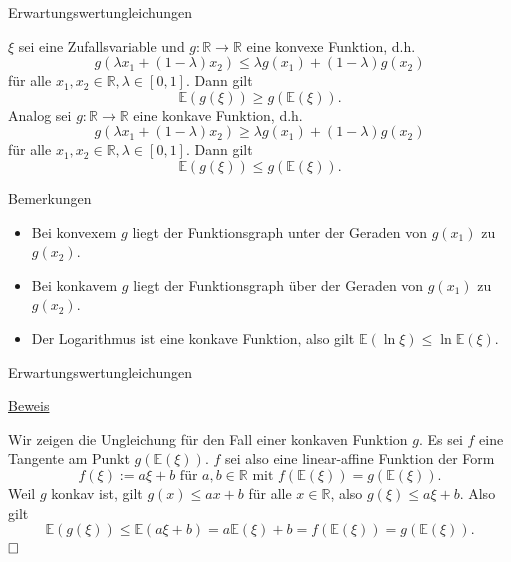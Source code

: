 \documentclass[
  8pt,
  ignorenonframetext,
]{beamer}
\providecommand{\tightlist}{%
  \setlength{\itemsep}{0pt}\setlength{\parskip}{0pt}}
\begin{document}
\begin{frame}{Erwartungswertungleichungen}
\protect\hypertarget{erwartungswertungleichungen-3}{}
\footnotesize
{}
\begin{theorem}
\justifying
\normalfont
$\xi$ sei eine Zufallsvariable und $g : \mathbb{R} \to \mathbb{R}$ eine konvexe Funktion, d.h.
\begin{equation}
g(\lambda x_1 + (1-\lambda)x_2) \le \lambda g(x_1) + (1-\lambda)g(x_2)
\end{equation}
für alle $x_1,x_2 \in \mathbb{R}, \lambda \in [0,1]$. Dann gilt
\begin{equation}
\mathbb{E}(g(\xi)) \ge g(\mathbb{E}(\xi)).
\end{equation}
Analog sei $g : \mathbb{R} \to \mathbb{R}$ eine konkave Funktion, d.h.
\begin{equation}
g(\lambda x_1 + (1-\lambda)x_2) \ge \lambda g(x_1) + (1-\lambda)g(x_2)
\end{equation}
für alle $x_1,x_2 \in \mathbb{R}, \lambda \in [0,1]$. Dann gilt
\begin{equation}
\mathbb{E}(g(\xi)) \le g(\mathbb{E}(\xi)).
\end{equation}
\end{theorem}

Bemerkungen

\begin{itemize}
\tightlist
\item
  Bei konvexem \(g\) liegt der Funktionsgraph unter der Geraden von
  \(g(x_1)\) zu \(g(x_2)\).
\item
  Bei konkavem \(g\) liegt der Funktionsgraph über der Geraden von
  \(g(x_1)\) zu \(g(x_2)\).
\item
  Der Logarithmus ist eine konkave Funktion, also gilt
  \(\mathbb{E}(\ln \xi) \le \ln \mathbb{E}(\xi)\).
\end{itemize}
\end{frame}

\begin{frame}{Erwartungswertungleichungen}
\protect\hypertarget{erwartungswertungleichungen-4}{}
\footnotesize

\underline{Beweis} \vspace{.2cm} 

Wir zeigen die Ungleichung für den Fall einer konkaven Funktion \(g\).
Es sei \(f\) eine Tangente am Punkt \(g(\mathbb{E}(\xi))\). \(f\) sei
also eine linear-affine Funktion der Form \begin{equation}
f(\xi) := a\xi + b \mbox{ für } a,b\in \mathbb{R} \mbox{ mit } f(\mathbb{E}(\xi)) = g(\mathbb{E}(\xi)).
\end{equation} Weil \(g\) konkav ist, gilt \(g(x) \le ax + b\) für alle
\(x \in \mathbb{R}\), also \(g(\xi) \le a\xi + b\). Also gilt
\begin{equation}
\mathbb{E}(g(\xi)) \le \mathbb{E}(a\xi + b) = a\mathbb{E}(\xi) + b = f(\mathbb{E}(\xi)) = g(\mathbb{E}(\xi)).
\end{equation} \(\hfill \Box\)
\end{frame}
\end{document}
